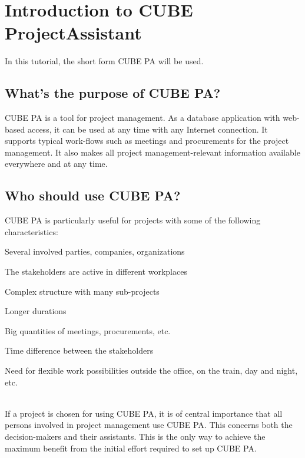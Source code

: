 
\section{Introduction to CUBE ProjectAssistant} %

In this tutorial, the short form CUBE PA will be used.

\subsection{What's the purpose of CUBE PA?} %

CUBE PA is a tool for project management. As a database application with web-based access, it can be used at any time with any Internet connection. It supports typical work-flows such as meetings and procurements for the project management. It also makes all project management-relevant information available everywhere and at any time.

\subsection{Who should use CUBE PA?} %

CUBE PA is particularly useful for projects with some of the following characteristics:

	
\begin{compactitem}
	\item Several involved parties, companies, organizations
	\item The stakeholders are active in different workplaces
	\item Complex structure with many sub-projects
	\item Longer durations
	\item Big quantities of meetings, procurements, etc.
	\item Time difference between the stakeholders
	\item Need for flexible work possibilities outside the office, on the train, day and night, etc.
\end{compactitem}	
		
\ \\
If a project is chosen for using CUBE PA, it is of central importance that all persons involved in project management use CUBE PA. This concerns both the decision-makers and their assistants. This is the only way to achieve the maximum benefit from the initial effort required to set up CUBE PA.
	
